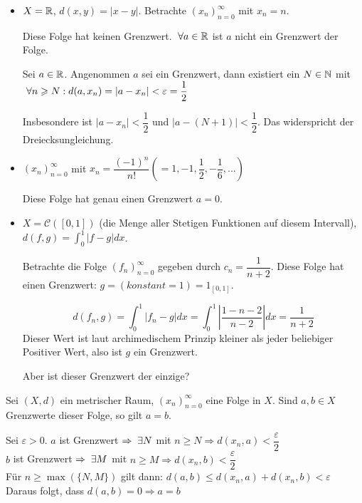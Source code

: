 \documentclass[main.tex]{subfiles}
\begin{document}
\begin{Beispiel}
  \begin{itemize}
    \item $X = \mathbb{R}$, $d(x,y)= |x-y|$. Betrachte $(x_n)_{n=0}^\infty$ mit $x_n = n$.

      Diese Folge hat keinen Grenzwert. $\;\forall a \in \mathbb{R}$ ist $a$ nicht ein Grenzwert der Folge.
      \begin{Beweis}
        Sei $a \in \mathbb{R}$. Angenommen $a$ sei ein Grenzwert, dann existiert ein $N \in \mathbb{N}$ mit $\;\forall n \geqslant N : d(a,x_n) = |a-x_n| < \varepsilon = \dfrac{1}{2}$

        Insbesondere ist $|a-x_n| < \dfrac{1}{2}$ und $|a-(N+1)| < \dfrac{1}{2}$. Das widerspricht der Dreiecksungleichung.
      \end{Beweis}
    \item $(x_n)_{n=0}^\infty$ mit $x_n = \dfrac{(-1)^n}{n!} \left(= 1,-1,\dfrac{1}{2},-\dfrac{1}{6},...\right)$

      Diese Folge hat genau einen Grenzwert $a = 0$.
    \item $X = \mathcal{C}([0,1])$ (die Menge aller Stetigen Funktionen auf diesem Intervall), $d(f,g) = \int_0^1 |f-g| dx$.

      Betrachte die Folge $(f_n)_{n=0}^\infty$ gegeben durch $c_n = \dfrac{1}{n+2}$. Diese Folge hat einen Grenzwert: $g = (konstant = 1) = 1_{[0,1]}$.
      \begin{Beweis}
        $$d(f_n,g) = \int_0^1 |f_n - g|dx = \int_0^1 \left|\dfrac{1 - n - 2}{n-2}\right| dx = \dfrac{1}{n+2}$$
        Dieser Wert ist laut archimedischem Prinzip kleiner als jeder beliebiger Positiver Wert, also ist $g$ ein Grenzwert.
      \end{Beweis}
      Aber ist dieser Grenzwert der einzige?
  \end{itemize}
\end{Beispiel}

\begin{Theorem}
  Sei $(X,d)$ ein metrischer Raum, $(x_n)_{n=0}^\infty$ eine Folge in $X$. Sind $a,b \in X$ Grenzwerte dieser Folge, so gilt $a = b$.
\end{Theorem}

\begin{Beweis}
  Sei $\varepsilon > 0$. $a$ ist Grenzwert $\Rightarrow \;\exists N$ mit $n\geq N \Rightarrow d(x_n,a) < \dfrac{\varepsilon}{2}$\\
  $b$ ist Grenzwert $\Rightarrow \;\exists M$ mit $n\geq M \Rightarrow d(x_n,b) < \dfrac{\varepsilon}{2}$\\
  Für $n \geq \max(\{N,M\})$ gilt dann: $d(a,b) \leq d(x_n,a) + d(x_n,b) < \varepsilon$\\
  Daraus folgt, dass $d(a,b) = 0 \Rightarrow a = b$
\end{Beweis}
\end{document}
